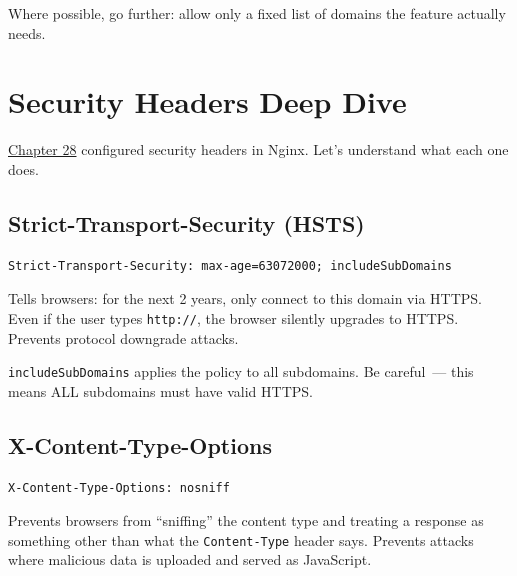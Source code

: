 \noindent{}Where possible, go further: allow only a fixed list of domains the feature actually needs.

\setcounter{section}{6}
\section{Security Headers Deep Dive}\label{38-security:387-security-headers-deep-dive}

\hyperref[ch:28-traffic-routing]{Chapter 28} configured security headers in Nginx. Let's understand what each one does.

\subsection*{Strict-Transport-Security (HSTS)}\label{38-security:strict-transport-security-hsts}

\begin{outputbox}[short]
\begin{Verbatim}[fontsize=\codesize, breaklines, breakanywhere, breaksymbolleft={\tiny\textcolor{muted}{$\hookrightarrow$}}]
Strict-Transport-Security: max-age=63072000; includeSubDomains
\end{Verbatim}
\end{outputbox}

\noindent{}Tells browsers: for the next 2 years, only connect to this domain via HTTPS. Even if the user types \texttt{http://}, the browser silently upgrades to HTTPS. Prevents protocol downgrade attacks.

\texttt{includeSubDomains} applies the policy to all subdomains. Be careful~--- this means ALL subdomains must have valid HTTPS.

\subsection*{X-Content-Type-Options}\label{38-security:x-content-type-options}

\begin{outputbox}[short]
\begin{Verbatim}[fontsize=\codesize, breaklines, breakanywhere, breaksymbolleft={\tiny\textcolor{muted}{$\hookrightarrow$}}]
X-Content-Type-Options: nosniff
\end{Verbatim}
\end{outputbox}

\noindent{}Prevents browsers from ``sniffing'' the content type and treating a response as something other than what the \texttt{Content-Type} header says. Prevents attacks where malicious data is uploaded and served as JavaScript.

